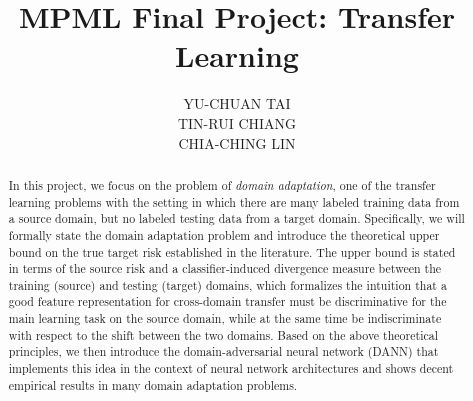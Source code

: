 \documentclass[11pt]{article}
\title{MPML Final Project: Transfer Learning}
\author{
	\parbox{0.25 \textwidth}{\centering YU-CHUAN TAI}
	\quad
	\parbox{0.25 \textwidth}{\centering TIN-RUI CHIANG}
	\quad
	\parbox{0.25 \textwidth}{\centering CHIA-CHING LIN}
}
\date{
	\parbox{0.25 \textwidth}{\centering B03902038}
	\quad
	\parbox{0.25 \textwidth}{\centering B03902072}
	\quad
	\parbox{0.25 \textwidth}{\centering D05921018}
}
\begin{document}
\maketitle

\thispagestyle{plain}

\begin{abstract}
In this project, we focus on the problem of \textit{domain adaptation}, one of the transfer learning problems with the setting in which there are many labeled training data from a source domain, but no labeled testing data from a target domain. Specifically, we will formally state the domain adaptation problem and introduce the theoretical upper bound on the true target risk established in the literature. The upper bound is stated in terms of the source risk and a classifier-induced divergence measure between the training (source) and testing (target) domains, which formalizes the intuition that a good feature representation for cross-domain transfer must be discriminative for the main learning task on the source domain, while at the same time be indiscriminate with respect to the shift between the two domains. Based on the above theoretical principles, we then introduce the domain-adversarial neural network (DANN) that implements this idea in the context of neural network architectures and shows decent empirical results in many domain adaptation problems.
\end{abstract}










\end{document}

